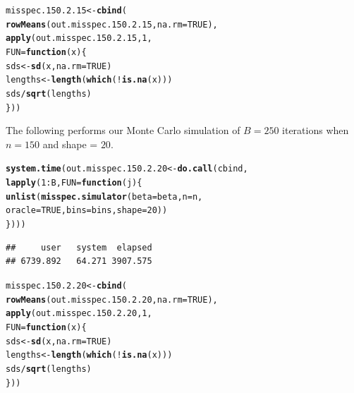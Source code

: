 \documentclass[11pt]{article}\usepackage[]{graphicx}\usepackage[]{color}
\makeatletter
\newcommand{\hlnum}[1]{\textcolor[rgb]{0.686,0.059,0.569}{#1}}%
\newcommand{\hlopt}[1]{\textcolor[rgb]{0,0,0}{#1}}%
\newcommand{\hlstd}[1]{\textcolor[rgb]{0.345,0.345,0.345}{#1}}%
\newcommand{\hlkwa}[1]{\textcolor[rgb]{0.161,0.373,0.58}{\textbf{#1}}}%
\newcommand{\hlkwb}[1]{\textcolor[rgb]{0.69,0.353,0.396}{#1}}%
\newcommand{\hlkwc}[1]{\textcolor[rgb]{0.333,0.667,0.333}{#1}}%
\newcommand{\hlkwd}[1]{\textcolor[rgb]{0.737,0.353,0.396}{\textbf{#1}}}%
\newenvironment{kframe}{%
 \def\at@end@of@kframe{}%
 \ifinner\ifhmode%
  \def\at@end@of@kframe{\end{minipage}}%
  \begin{minipage}{\columnwidth}%
 \fi\fi%
 \def\FrameCommand##1{\hskip\@totalleftmargin \hskip-\fboxsep
 \colorbox{shadecolor}{##1}\hskip-\fboxsep
     \hskip-\linewidth \hskip-\@totalleftmargin \hskip\columnwidth}%
 \MakeFramed {\advance\hsize-\width
   \@totalleftmargin\z@ \linewidth\hsize
   \@setminipage}}%
 {\par\unskip\endMakeFramed%
 \at@end@of@kframe}
\newenvironment{knitrout}{}{} %
\makeatother
\begin{document}
\begin{knitrout}
\color{fgcolor}\begin{kframe}
\begin{alltt}
\hlstd{misspec.150.2.15} \hlkwb{<-} \hlkwd{cbind}\hlstd{(}
  \hlkwd{rowMeans}\hlstd{(out.misspec.150.2.15,} \hlkwc{na.rm} \hlstd{=} \hlnum{TRUE}\hlstd{),}
  \hlkwd{apply}\hlstd{(out.misspec.150.2.15,} \hlnum{1}\hlstd{,}
  \hlkwc{FUN} \hlstd{=} \hlkwa{function}\hlstd{(}\hlkwc{x}\hlstd{)\{}
    \hlstd{sds} \hlkwb{<-} \hlkwd{sd}\hlstd{(x,} \hlkwc{na.rm} \hlstd{=} \hlnum{TRUE}\hlstd{)}
    \hlstd{lengths} \hlkwb{<-} \hlkwd{length}\hlstd{(}\hlkwd{which}\hlstd{(}\hlopt{!}\hlkwd{is.na}\hlstd{(x)))}
    \hlstd{sds} \hlopt{/} \hlkwd{sqrt}\hlstd{(lengths)}
  \hlstd{\}))}
\end{alltt}
\end{kframe}
\end{knitrout}

The following performs our Monte Carlo simulation of $B = 250$ iterations 
when $n = 150$ and shape = $20$.

\begin{knitrout}
\color{fgcolor}\begin{kframe}
\begin{alltt}
\hlkwd{system.time}\hlstd{(out.misspec.150.2.20} \hlkwb{<-} \hlkwd{do.call}\hlstd{(cbind,}
  \hlkwd{lapply}\hlstd{(}\hlnum{1}\hlopt{:}\hlstd{B,} \hlkwc{FUN} \hlstd{=} \hlkwa{function}\hlstd{(}\hlkwc{j}\hlstd{)\{}
    \hlkwd{unlist}\hlstd{(}\hlkwd{misspec.simulator}\hlstd{(}\hlkwc{beta} \hlstd{= beta,} \hlkwc{n} \hlstd{= n,}
      \hlkwc{oracle} \hlstd{=} \hlnum{TRUE}\hlstd{,} \hlkwc{bins} \hlstd{= bins,} \hlkwc{shape} \hlstd{=} \hlnum{20}\hlstd{))}
\hlstd{\})))}
\end{alltt}
\begin{verbatim}
##     user   system  elapsed 
## 6739.892   64.271 3907.575
\end{verbatim}
\end{kframe}
\end{knitrout}

\begin{knitrout}
\color{fgcolor}\begin{kframe}
\begin{alltt}
\hlstd{misspec.150.2.20} \hlkwb{<-} \hlkwd{cbind}\hlstd{(}
  \hlkwd{rowMeans}\hlstd{(out.misspec.150.2.20,} \hlkwc{na.rm} \hlstd{=} \hlnum{TRUE}\hlstd{),}
  \hlkwd{apply}\hlstd{(out.misspec.150.2.20,} \hlnum{1}\hlstd{,}
  \hlkwc{FUN} \hlstd{=} \hlkwa{function}\hlstd{(}\hlkwc{x}\hlstd{)\{}
    \hlstd{sds} \hlkwb{<-} \hlkwd{sd}\hlstd{(x,} \hlkwc{na.rm} \hlstd{=} \hlnum{TRUE}\hlstd{)}
    \hlstd{lengths} \hlkwb{<-} \hlkwd{length}\hlstd{(}\hlkwd{which}\hlstd{(}\hlopt{!}\hlkwd{is.na}\hlstd{(x)))}
    \hlstd{sds} \hlopt{/} \hlkwd{sqrt}\hlstd{(lengths)}
  \hlstd{\}))}
\end{alltt}
\end{kframe}
\end{knitrout}
\end{document}
